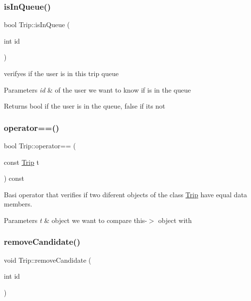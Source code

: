 \subsubsection{\texorpdfstring{is\+In\+Queue()}{isInQueue()}}
{\footnotesize\ttfamily bool Trip\+::is\+In\+Queue (\begin{DoxyParamCaption}\item[{int}]{id }\end{DoxyParamCaption})}



verifyes if the user is in this trip queue 


\begin{DoxyParams}{Parameters}
{\em id} & of the user we want to know if is in the queue \\
\hline
\end{DoxyParams}
\begin{DoxyReturn}{Returns}
bool if the user is in the queue, false if it\textquotesingle{}s not 
\end{DoxyReturn}
\mbox{\label{group___trip_ga1462791c70b237e595244b16e086850f}} 
\subsubsection{\texorpdfstring{operator==()}{operator==()}}
{\footnotesize\ttfamily bool Trip\+::operator== (\begin{DoxyParamCaption}\item[{const \hyperlink{class_trip}{Trip}}]{t }\end{DoxyParamCaption}) const}



Basi operator that verifies if two diferent objects of the class \hyperlink{class_trip}{Trip} have equal data members. 


\begin{DoxyParams}{Parameters}
{\em t} & object we want to compare this-\/$>$ object with \\
\hline
\end{DoxyParams}
\mbox{\label{group___trip_ga5c0fbf9c2320dc4799896295788eff9e}} 
\subsubsection{\texorpdfstring{remove\+Candidate()}{removeCandidate()}}
{\footnotesize\ttfamily void Trip\+::remove\+Candidate (\begin{DoxyParamCaption}\item[{int}]{id }\end{DoxyParamCaption})}



